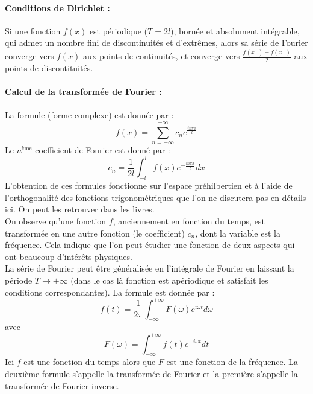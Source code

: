 \documentclass{report}
\begin{document}
		\paragraph{Conditions de Dirichlet :}
		Si une fonction $f(x)$ est périodique ($T=2l$), bornée et absolument intégrable, qui admet un nombre fini de discontinuités et d'extrêmes, alors sa série de Fourier converge vers $f(x)$ aux points de continuités, et converge vers $\frac{f(x^{+})+f(x^{-})}{2}$ aux points de discontituités.

		\paragraph{Calcul de la transformée de Fourier :}
		La formule (forme complexe) est donnée par :
		\begin{displaymath}
			f(x) = \sum_{n=-\infty}^{+\infty}c_ne^{\frac{in\pi x}{l}}
		\end{displaymath}
		Le $n^\text{ème}$ coefficient de Fourier est donné par :
		\begin{displaymath}
			c_n = \frac{1}{2l} \int_{-l}^{l}f(x)e^{-\frac{in\pi x}{l}}dx
		\end{displaymath}
		L'obtention de ces formules fonctionne sur l'espace préhilbertien et à l'aide de l'orthogonalité des fonctions trigonométriques que l'on ne discutera pas en détails ici. On peut les retrouver dans les livres.\\
		On observe qu'une fonction $f$, anciennement en fonction du temps, est transformée en une autre fonction (le coefficient) $c_n$, dont la variable est la fréquence. Cela indique que l'on peut étudier une fonction de deux aspects qui ont beaucoup d'intérêts physiques.\\

		La série de Fourier peut être généralisée en l'intégrale de Fourier en laissant la période $T\to +\infty $ (dans le cas là fonction est apériodique et satisfait les conditions correspondantes). La formule est donnée par :
		\begin{displaymath}
			f(t)=\frac{1}{2\pi}\int_{-\infty}^{+\infty}F(\omega)e^{i\omega t}d\omega
		\end{displaymath}
		avec
		\begin{displaymath}
			F(\omega)=\int_{-\infty}^{+\infty}f(t)e^{-i\omega t}dt
		\end{displaymath}
		Ici $f$ est une fonction du temps alors que $F$ est une fonction de la fréquence. La deuxième formule s'appelle la transformée de Fourier et la première s'appelle la transformée de Fourier inverse.\\
\end{document}

